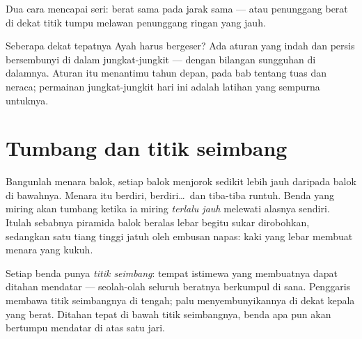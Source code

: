 \begin{omfigure}

{\small Dua cara mencapai seri: berat sama pada jarak sama --- atau
penunggang berat di dekat titik tumpu melawan penunggang ringan yang
jauh.}
\end{omfigure}

\begin{remark}\label{rem:g2:balance-equilibrium:promise}
Seberapa dekat tepatnya Ayah harus bergeser? Ada aturan yang indah dan
persis bersembunyi di dalam jungkat-jungkit --- dengan bilangan
sungguhan di dalamnya. Aturan itu menantimu tahun depan, pada bab
tentang tuas dan neraca; permainan jungkat-jungkit hari ini adalah
latihan yang sempurna untuknya.
\end{remark}

\section{Tumbang dan titik seimbang}

\begin{example}\label{ex:g2:balance-equilibrium:tower}
Bangunlah menara balok, setiap balok menjorok sedikit lebih jauh
daripada balok di bawahnya. Menara itu berdiri, berdiri\dots\ dan
tiba-tiba runtuh. Benda yang miring akan tumbang ketika ia miring
\emph{terlalu jauh} melewati alasnya sendiri. Itulah sebabnya piramida
balok beralas lebar begitu sukar dirobohkan, sedangkan satu tiang
tinggi jatuh oleh embusan napas: kaki yang lebar membuat menara yang
kukuh.
\end{example}

\begin{definition}\label{def:g2:balance-equilibrium:point}
Setiap benda punya \emph{titik seimbang}: tempat
istimewa yang membuatnya dapat ditahan mendatar --- seolah-olah
seluruh beratnya berkumpul di sana. Penggaris membawa titik
seimbangnya di tengah; palu menyembunyikannya di dekat kepala yang
berat. Ditahan tepat di bawah titik seimbangnya, benda apa pun akan
bertumpu mendatar di atas satu jari.
\end{definition}

